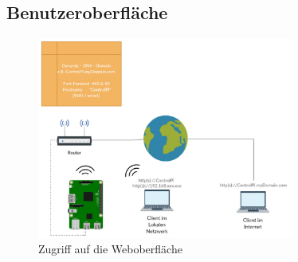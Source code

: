 \subsection{Benutzeroberfläche}
 \begin{figure}[H]
	\begin{center}
		\includegraphics[width=0.75\textwidth ,clip]{./images/IFTTT.pdf}
		\caption{Zugriff auf die Weboberfläche}
		\label{img:externalAccess}
	\end{center} 
\end{figure}

